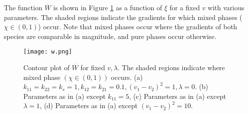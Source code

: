 \documentclass[11pt]{article}
\begin{document}
The function $\overline{W}$ is shown in Figure \ref{fig:Wbar} as a function of $\xi$ for a fixed $v$ with various parameters. The shaded regions indicate the gradients for which mixed phases ($\chi\in(0,1)$) occur. Note that mixed phases occur where the gradients of both species are comparable in magnitude, and pure phases occur otherwise. 

\begin{figure}
\label{fig:Wbar}
\centering
\vspace{0.5in}
	\texttt{[image: w.png]}
\vspace{0.5in}
\caption{Contour plot of $\overline{W}$ for fixed $v,\lambda$.  The shaded regions indicate where mixed phase $(\chi\in(0,1))$ occurs.  (a) $k_{11} = k_{22} = k_s = 1, k_{12} = k_{21} =0.1, (v_1 - v_2)^2=1, \lambda = 0$.
(b) Parameters as in (a) except $k_{11} = 5$, (c) Parameters as in (a) except $\lambda = 1$, (d) Parameters as in (a) except $(v_1-v_2)^2 = 10 $.  }
\end{figure}
\end{document}
